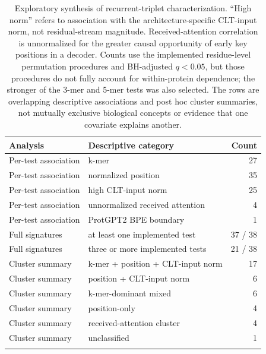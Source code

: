 \documentclass[pdflatex,sn-nature]{sn-jnl}
\begin{document}
\clearpage

\begin{table}[p!]
\caption{Exploratory synthesis of recurrent-triplet characterization. ``High norm'' refers to association with the architecture-specific CLT-input norm, not residual-stream magnitude. Received-attention correlation is unnormalized for the greater causal opportunity of early key positions in a decoder. Counts use the implemented residue-level permutation procedures and BH-adjusted $q<0.05$, but those procedures do not fully account for within-protein dependence; the stronger of the 3-mer and 5-mer tests was also selected. The rows are overlapping descriptive associations and post hoc cluster summaries, not mutually exclusive biological concepts or evidence that one covariate explains another.}
\label{tab:supp-synthesis}
\scriptsize
\begin{tabular}{@{}llr@{}}
\toprule
Analysis & Descriptive category & Count \\
\midrule
Per-test association & k-mer & 27 \\
Per-test association & normalized position & 35 \\
Per-test association & high CLT-input norm & 25 \\
Per-test association & unnormalized received attention & 4 \\
Per-test association & ProtGPT2 BPE boundary & 1 \\
Full signatures & at least one implemented test & 37 / 38 \\
Full signatures & three or more implemented tests & 21 / 38 \\
Cluster summary & k-mer + position + CLT-input norm & 17 \\
Cluster summary & position + CLT-input norm & 6 \\
Cluster summary & k-mer-dominant mixed & 6 \\
Cluster summary & position-only & 4 \\
Cluster summary & received-attention cluster & 4 \\
Cluster summary & unclassified & 1 \\
\botrule
\end{tabular}
\end{table}

\clearpage
\end{document}

